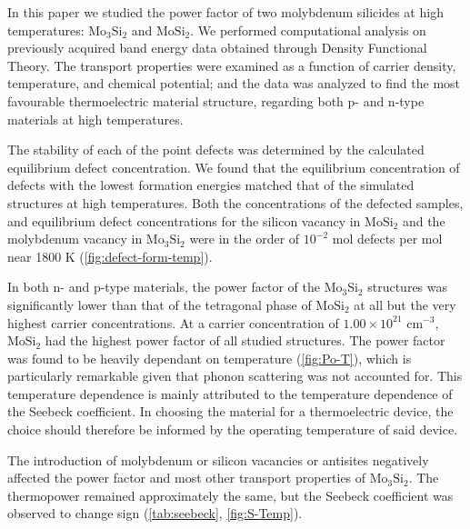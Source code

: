 \documentclass[7.5pt]{article}
\theoremstyle{plain}
\theoremstyle{definition}
\newcommand{\<}{\langle}
\renewcommand{\>}{\rangle}
\begin{document}
\begin{multicols}{2}

\noindent In this paper we studied the power factor of two molybdenum silicides at high temperatures: $\text{Mo}_3\text{Si}_2$ and $\text{MoSi}_2$. 
We performed computational analysis on previously acquired band energy data obtained through Density Functional Theory. 
The transport properties were examined as a function of carrier density, temperature, and chemical potential; and the data was analyzed to find the most favourable thermoelectric material structure, regarding both p- and n-type materials at high temperatures. 

The stability of each of the point defects was determined by the calculated equilibrium defect concentration. 
We found that the equilibrium concentration of defects with the lowest formation energies matched that of the simulated structures at high temperatures. 
Both the concentrations of the defected samples, and equilibrium defect concentrations for the silicon vacancy in $\text{MoSi}_2$ and the molybdenum vacancy in $\text{Mo}_3\text{Si}_2$ were in the order of $10^{-2}$ mol defects per mol near 1800 K (\autoref{fig:defect-form-temp}).

In both n- and p-type materials, the power factor of the $\text{Mo}_3\text{Si}_2$ structures was significantly lower than that of the tetragonal phase of $\text{MoSi}_{2}$ at all but the very highest carrier concentrations. 
At a carrier concentration of $1.00 \times 10^{21}$ cm$^{-3}$, $\text{MoSi}_2$ had the highest power factor of all studied structures.
The power factor was found to be heavily dependant on temperature (\autoref{fig:Po-T}), which is particularly remarkable given that phonon scattering was not accounted for. 
This temperature dependence is mainly attributed to the temperature dependence of the Seebeck coefficient. 
In choosing the material for a thermoelectric device, the choice should therefore be informed by the operating temperature of said device.

The introduction of molybdenum or silicon vacancies or antisites negatively affected the power factor and most other transport properties of $\text{Mo}_3\text{Si}_2$.
The thermopower remained approximately the same, but the Seebeck coefficient was observed to change sign (\autoref{tab:seebeck}, \autoref{fig:S-Temp}).



\end{multicols}
\end{document}
